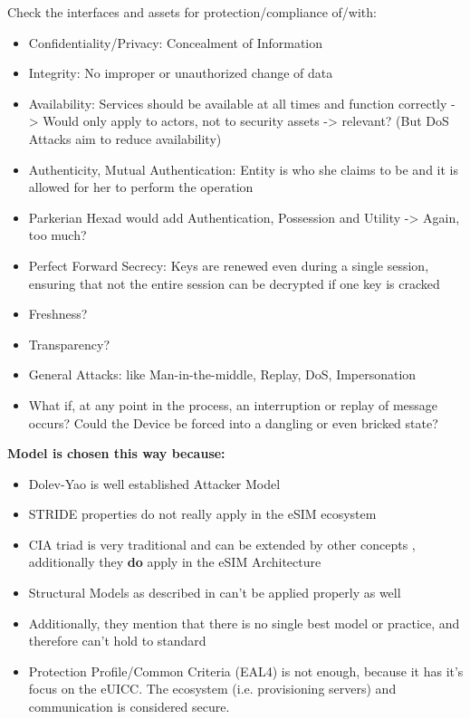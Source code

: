 Check the interfaces and assets for protection/compliance of/with:
\begin{itemize}
    \item Confidentiality/Privacy: Concealment of Information
    \item Integrity: No improper or unauthorized change of data
    \item Availability: Services should be available at all times and function correctly -> Would only apply to actors, not to security assets -> relevant? (But DoS Attacks aim to reduce availability)
    \item Authenticity, Mutual Authentication: Entity is who she claims to be and it is allowed for her to perform the operation
    \item Parkerian Hexad would add Authentication, Possession and Utility -> Again, too much?
    \item Perfect Forward Secrecy: Keys are renewed even during a single session, ensuring that not the entire session can be decrypted if one key is cracked
    \item Freshness?
    \item Transparency?
    \item General Attacks: like Man-in-the-middle, Replay, DoS, Impersonation
    \item What if, at any point in the process, an interruption or replay of message occurs? Could the Device be forced into a dangling or even bricked state?
\end{itemize}

\textbf{Model is chosen this way because:}
\begin{itemize}
    \item Dolev-Yao is well established Attacker Model
    \item STRIDE properties do not really apply in the eSIM ecosystem
    \item CIA triad is very traditional and can be extended by other concepts \parencite{Fabian:SecReqEngin}, additionally they \textbf{do} apply in the eSIM Architecture
    \item Structural Models as described in \parencite{Fabian:SecReqEngin, Mellado:SysRevofSecReqEng} can't be applied properly as well
    \item Additionally, they mention that there is no single best model or practice, and therefore can't hold to standard
    \item Protection Profile/Common Criteria (EAL4) \parencite{SGP:05, SGP:25} is not enough, because it has it's focus on the eUICC. The ecosystem (i.e. provisioning servers) and communication is considered secure.
\end{itemize}

